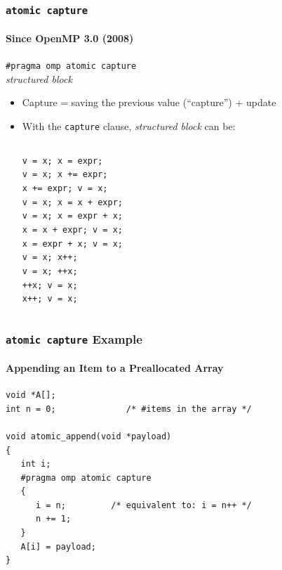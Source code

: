 \documentclass{beamer}
\begin{document}
\begin{frame}[fragile=singleslide]
  \frametitle{\texttt{atomic capture}}
  \framesubtitle{Since OpenMP 3.0 (2008)} 
  
  {\scriptsize 
    \begin{framed}
      {\tt \#pragma omp atomic \alert{capture}}\\ 
      \textit{structured block}
    \end{framed}
  }

  \begin{itemize}
  \item Capture = saving the previous value (``capture'') + update 
    
  \item With the \texttt{capture} clause, \textit{structured block} can be: 

\begin{center}
  \begin{columns}[t]
    \texttt{{v = x; x = expr;}}\\
    \texttt{{v = x; x += expr;}}\\
    \texttt{{x += expr; v = x;}}\\
    \texttt{{v = x; x = x + expr;}}\\
    \texttt{{v = x; x = expr + x;}}\\
    \texttt{{x = x + expr; v = x;}}\\
    \texttt{{x = expr + x; v = x;}}\\
    
      \texttt{{v = x; x++;}}\\
      \texttt{{v = x; ++x;}}\\
      \texttt{{++x; v = x;}}\\
      \texttt{{x++; v = x;}}\\
  \end{columns}
\end{center}
\end{itemize}    
\end{frame}


\begin{frame}[fragile=singleslide]
  \frametitle{\texttt{atomic capture} Example}
  \framesubtitle{Appending an Item to a Preallocated Array}

\begin{verbatim}
void *A[];
int n = 0;              /* #items in the array */

void atomic_append(void *payload)
{ 
   int i;
   #pragma omp atomic capture 
   {
      i = n;         /* equivalent to: i = n++ */
      n += 1;
   }
   A[i] = payload;
}
\end{verbatim}
\end{frame}
\end{document}
